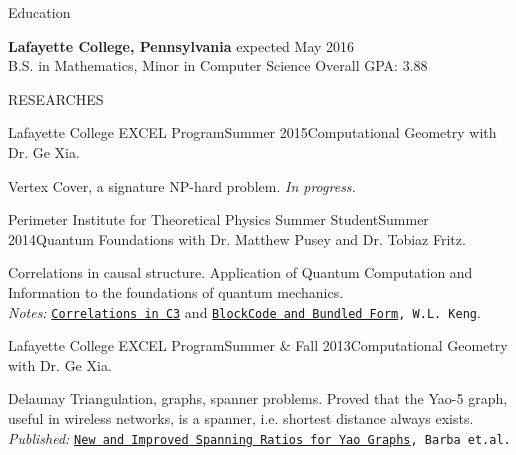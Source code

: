 \documentclass{resume} %
\begin{document}
\begin{rSection}{Education}

{\bf Lafayette College, Pennsylvania} \hfill expected May 2016\\ 
B.S. in Mathematics, Minor in Computer Science \hfill Overall GPA: 3.88
\end{rSection}


\begin{rSection}{RESEARCHES}

\begin{rSubsection}{Lafayette College EXCEL Program}{Summer 2015}{Computational Geometry with Dr. Ge Xia.}{}
\item Vertex Cover, a signature NP-hard problem. {\em In progress.}
\end{rSubsection}


\begin{rSubsection}{Perimeter Institute for Theoretical Physics Summer Student}{Summer 2014}{Quantum Foundations with Dr. Matthew Pusey and Dr. Tobiaz Fritz.}{}
\item Correlations in causal structure. Application of Quantum Computation and Information to the foundations of quantum mechanics. \\
{\em Notes:} {\tt \href{https://github.com/kengz/Quantum-Foundations-Correlations/blob/master/Keng%20Correlations%20in%20C3.pdf}{\textcolor{Cerulean}{Correlations in C3}}} and {\tt \href{https://github.com/kengz/Quantum-Foundations-Correlations/blob/master/Keng%20blockcode.pdf}{\textcolor{Cerulean}{BlockCode and Bundled Form}}, W.L. Keng}.
\end{rSubsection}


\begin{rSubsection}{Lafayette College EXCEL Program}{Summer \& Fall 2013}{Computational Geometry with Dr. Ge Xia.}{}
\item Delaunay Triangulation, graphs, spanner problems. Proved that the Yao-5 graph, useful in wireless networks, is a spanner, i.e. shortest distance always exists.\\
{\em Published:} {\tt \href{http://arxiv.org/abs/1307.5829}{\textcolor{Cerulean}{New and Improved Spanning Ratios for Yao Graphs}}, Barba et.al.}
\end{rSubsection}


\end{rSection}
\end{document}
